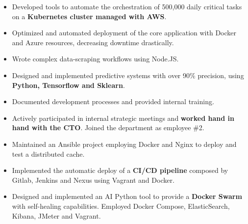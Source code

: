 \documentclass[10pt,a4paper]{altacv}
\begin{document}
\begin{itemize}
	\item Developed tools to automate the orchestration of 500,000 daily critical tasks on a \textbf{Kubernetes cluster managed with AWS}.
	\item Optimized and automated deployment of the core application with Docker and Azure resources, decreasing downtime drastically.
	\item Wrote complex data-scraping workflows using Node.JS.
	\item Designed and implemented predictive systems with over 90\% precision, using \textbf{Python, Tensorflow and Sklearn}.
	\item Documented development processes and provided internal training.
	\item Actively participated in internal strategic meetings and \textbf{worked hand in hand with the CTO}. Joined the department as employee \#2.
\end{itemize}

\divider

\begin{itemize}
	\item Maintained an Ansible project employing Docker and Nginx to deploy and test a distributed cache.
	\item Implemented the automatic deploy of a \textbf{CI/CD pipeline} composed by Gitlab, Jenkins and Nexus using Vagrant and Docker.
	\item Designed and implemented an AI Python tool to provide a \textbf{Docker Swarm} with self-healing capabilities. Employed Docker Compose, ElasticSearch, Kibana, JMeter and Vagrant.
\end{itemize}


\nocite{*}

\printbibliography[heading=pubtype,title={\printinfo{\faBook}{Dissertations}},type=book]
\end{document}
